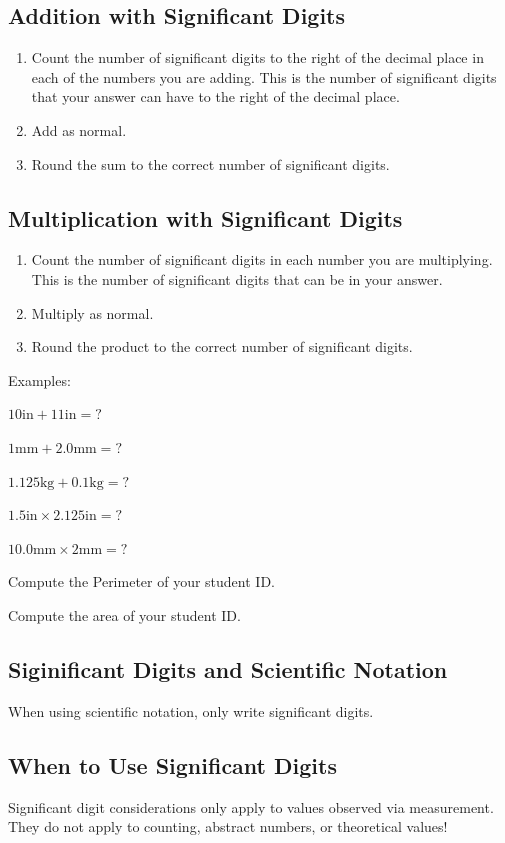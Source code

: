 \documentclass{article}
\begin{document}
\subsection{Addition with Significant Digits}
\begin{enumerate}
    \item Count the number of significant digits to the right of the decimal place in each of the numbers you are adding. This is the number of significant digits that your answer can have to the right of the decimal place.
    \item Add as normal.
    \item Round the sum to the correct number of significant digits.
\end{enumerate}
\subsection{Multiplication with Significant Digits}
\begin{enumerate}
    \item Count the number of significant digits in each number you are multiplying. This is the number of significant digits that can be in your answer.
    \item Multiply as normal.
    \item Round the product to the correct number of significant digits.
\end{enumerate}
Examples: \newline 
\begin{enumerate*}[label=\ \ (\alph*)]
    \item $10\mathrm{in} + 11\mathrm{in} = ?$
    \item $1\mathrm{mm} + 2.0\mathrm{mm} = ?$ 
    \item $1.125\mathrm{kg} + 0.1\mathrm{kg} = ?$
    \item $1.5\mathrm{in} \times 2.125\mathrm{in} = ?$ \newline
    \item $10.0\mathrm{mm} \times 2\mathrm{mm} = ?$
    \item Compute the Perimeter of your student ID.\newline
    \item Compute the area of your student ID.
\end{enumerate*}

\subsection{Siginificant Digits and Scientific Notation}
When using scientific notation, only write significant digits.

\subsection{When to Use Significant Digits}
Significant digit considerations only apply to values observed via measurement.  They do not apply to counting, abstract numbers, or theoretical values!
\end{document}
